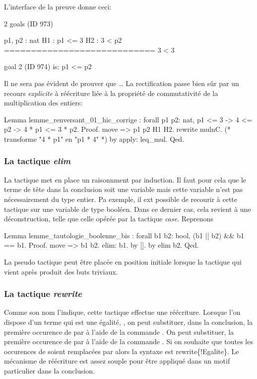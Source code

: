 \documentclass[a4paper,10pt]{article}
\begin{document}
L'interface de la preuve donne ceci:

\begin{coqout}{}{}
  2 goals (ID 973)

  p1, p2 : nat
  H1 : p1 <= 3
  H2 : 3 < p2
  ============================
  3 < 3

goal 2 (ID 974) is:
 p1 <= p2
\end{coqout}

Il ne sera pas évident de prouver que \ldots{}  La rectification passe bien sûr par un recours
\emph{explicite} à réécriture liée à la propriété de commutativité de la multiplication des entiers:

\begin{coq}[]
Lemma lemme_renversant_01_hic_corrige : forall p1 p2: nat, p1 <= 3 -> 4 <= p2 -> 4 * p1 <= 3 * p2.
Proof.
  move => p1 p2 H1 H2.
  rewrite mulnC. (* transforme "4 * p1" en "p1 * 4" *)
  by apply: leq_mul.
Qed.
\end{coq}

\subsubsection{La tactique \emph{elim}}
\label{sec:orge503283}
La tactique  met en place un raisonnment par induction.  Il faut pour cela que le terme de tête dans
la conclusion soit une variable mais cette variable n'est pas nécessairement du type entier.  Pa exemple, il
ext possible de recourir à cette tactique sur une variable de type booléen.  Dans ce dernier cas, cela
revient à une déconstruction, telle que celle opérée par la tactique \emph{case}.  Reprenons

\begin{coq}[]
Lemma lemme_tautologie_boolenne_bis : forall b1 b2: bool, (b1 || b2) && b1 == b1.
Proof.
  move => b1 b2.
  elim: b1.
  by [].
  by elim b2.
Qed.
\end{coq}

La pseudo tactique  peut être placée en position initiale lorsque la tactique qui vient après produit
des buts triviaux.

\subsubsection{La tactique \emph{rewrite}}
\label{sec:org5075ac2}
Comme son nom l'indique, cette tactique effectue une réécriture.  Lorsque l'on dispose d'un terme qui est
une égalité, , on peut substituer, dans la conclusion, la première occurence de  par
 à l'aide de la commande .  On peut substituer, la première occurence de  par
 à l'aide de la commande .  Si on souhaite que toutes les occurences de 
soient remplacées par  alors la syntaxe est rewrite\{!Egalite\}.  Le mécanisme de réécriture est assez
souple pour être appliqué dans un motif particulier dans la conclusion.
\end{document}
